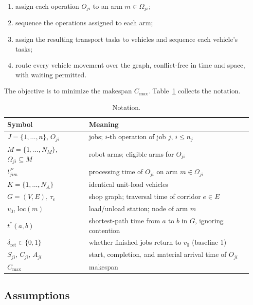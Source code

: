\documentclass[manuscript,screen,review]{acmart}
\begin{document}
\begin{enumerate}[label=(\roman*),leftmargin=*,topsep=2pt,itemsep=1pt]
\item assign each operation $O_{ji}$ to an arm $m\in\Omega_{ji}$;
\item sequence the operations assigned to each arm;
\item assign the resulting transport tasks to vehicles and sequence each
vehicle's tasks;
\item route every vehicle movement over the graph, conflict-free in time and
space, with waiting permitted.
\end{enumerate}

The objective is to minimize the makespan $C_{\max}$. Table~\ref{tab:notation}
collects the notation.

\begin{table}[t]
\caption{Notation.}
\label{tab:notation}
\small
\begin{tabular}{@{}ll@{}}
\toprule
Symbol & Meaning \\
\midrule
$J=\{1,\dots,n\}$, $O_{ji}$ & jobs; $i$-th operation of job $j$, $i\le n_j$ \\
$M=\{1,\dots,N_M\}$, $\Omega_{ji}\subseteq M$ & robot arms; eligible arms for $O_{ji}$ \\
$t^P_{jim}$ & processing time of $O_{ji}$ on arm $m\in\Omega_{ji}$ \\
$K=\{1,\dots,N_A\}$ & identical unit-load vehicles \\
$G=(V,E)$, $\tau_e$ & shop graph; traversal time of corridor $e\in E$ \\
$v_0$, $\mathrm{loc}(m)$ & load/unload station; node of arm $m$ \\
$t^{*}(a,b)$ & shortest-path time from $a$ to $b$ in $G$, ignoring contention \\
$\delta_{\mathrm{ret}}\in\{0,1\}$ & whether finished jobs return to $v_0$ (baseline $1$) \\
$S_{ji}$, $C_{ji}$, $A_{ji}$ & start, completion, and material arrival time of $O_{ji}$ \\
$C_{\max}$ & makespan \\
\bottomrule
\end{tabular}
\end{table}

\subsection{Assumptions}
\label{sec:assumptions}
\end{document}

